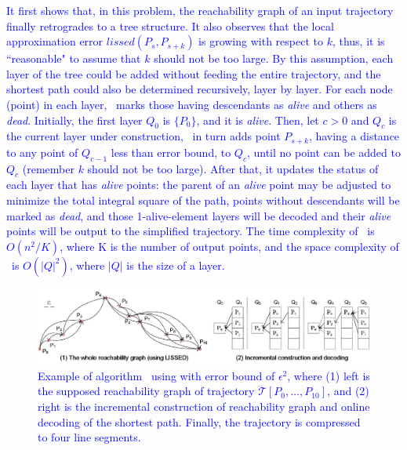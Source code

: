 \textcolor{blue}{It first shows that, in this problem, the reachability graph of an input trajectory finally retrogrades to a tree structure. It also observes that the local approximation error $lissed(P_s,P_{s+k})$ is growing with respect to $k$, thus, it is ``reasonable" to assume that $k$ should not be too large. 
By this assumption, each layer of the tree could be added without feeding the entire trajectory, and the shortest path could also be determined recursively, \ie layer by layer.}
%
\textcolor{blue}{For each node (point) in each layer, \dagots~marks those having descendants as \emph{alive} and others as \emph{dead}.
Initially, the first layer $Q_0$ is $\{P_0\}$, and it is \emph{alive}. }
%
\textcolor{blue}{Then, let $c>0$ and $Q_c$ is the current layer under construction, 
\dagots~in turn adds point $P_{s+k}$, having a \lissed distance to any point of $Q_{c-1}$ less than error bound, to $Q_c$, until no point can be added to $Q_c$ (remember $k$ should not be too large). After that, it updates the status of each layer that has \emph{alive} points: the parent of an \emph{alive} point may be adjusted to minimize the total integral square \sed of the path, points without descendants will be marked as \emph{dead}, and those 1-alive-element layers will be decoded and their \emph{alive} points will be output to the simplified trajectory. }
%
\textcolor{blue}{The time complexity of \dagots~is $O(n^2/K)$, where K is the number of output points, and the space complexity of \dagots~is $O(|Q|^2)$, where $|Q|$ is the size of a layer.}

\begin{figure}[tb!]
	\centering
	\includegraphics[scale=0.79]{Figures/Fig-DOTS.jpg}
	\vspace{-2ex}
	\caption{\small \textcolor{blue}{Example of algorithm \dagots~using \lissed with error bound of $\epsilon^2$, where (1) left is the supposed reachability graph of trajectory $\dddot{\mathcal{T}}[P_0, \ldots, P_{10}]$, and (2) right is the incremental construction of reachability graph and online decoding of the shortest path. Finally, the trajectory is compressed to four line segments.} }
	\vspace{-1ex}
	\label{fig:dots}
\end{figure}



